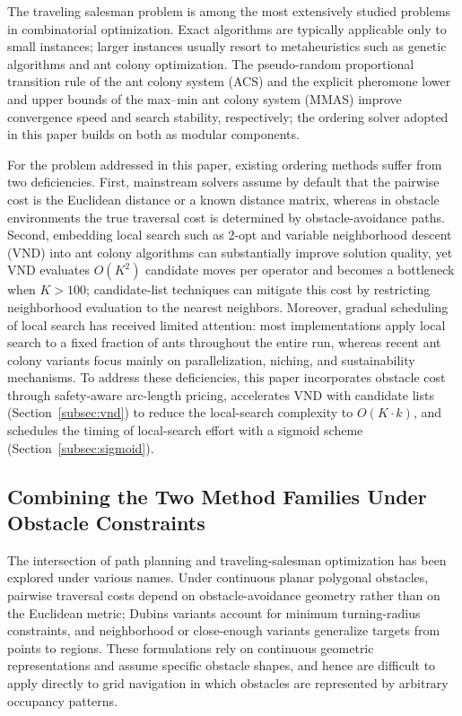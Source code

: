 \documentclass[lettersize,journal]{IEEEtran}
\begin{document}
The traveling salesman problem is among the most extensively studied problems in combinatorial optimization\textcolor{blue}{\cite{ref4,ref36}}. Exact algorithms are typically applicable only to small instances; larger instances usually resort to metaheuristics such as genetic algorithms\textcolor{blue}{\cite{ref19}} and ant colony optimization\textcolor{blue}{\cite{ref21,ref42}}. The pseudo-random proportional transition rule of the ant colony system (ACS)\textcolor{blue}{\cite{ref22}} and the explicit pheromone lower and upper bounds of the max--min ant colony system (MMAS)\textcolor{blue}{\cite{ref23}} improve convergence speed and search stability, respectively; the ordering solver adopted in this paper builds on both as modular components.

For the problem addressed in this paper, existing ordering methods suffer from two deficiencies. First, mainstream solvers assume by default that the pairwise cost is the Euclidean distance or a known distance matrix, whereas in obstacle environments the true traversal cost is determined by obstacle-avoidance paths. Second, embedding local search such as 2-opt and variable neighborhood descent (VND) into ant colony algorithms can substantially improve solution quality\textcolor{blue}{\cite{ref24,ref25,ref43}}, yet VND evaluates $O(K^2)$ candidate moves per operator and becomes a bottleneck when $K > 100$; candidate-list techniques can mitigate this cost by restricting neighborhood evaluation to the nearest neighbors\textcolor{blue}{\cite{ref26}}. Moreover, gradual scheduling of local search has received limited attention: most implementations apply local search to a fixed fraction of ants throughout the entire run, whereas recent ant colony variants focus mainly on parallelization, niching, and sustainability mechanisms\textcolor{blue}{\cite{ref27,ref28,ref29,ref30}}. To address these deficiencies, this paper incorporates obstacle cost through safety-aware arc-length pricing, accelerates VND with candidate lists (Section~\textcolor{blue}{\ref{subsec:vnd}}) to reduce the local-search complexity to $O(K \cdot k)$, and schedules the timing of local-search effort with a sigmoid scheme (Section~\textcolor{blue}{\ref{subsec:sigmoid}}).

\subsection{Combining the Two Method Families Under Obstacle Constraints}

The intersection of path planning and traveling-salesman optimization has been explored under various names\textcolor{blue}{\cite{ref4,ref36}}. Under continuous planar polygonal obstacles, pairwise traversal costs depend on obstacle-avoidance geometry rather than on the Euclidean metric\textcolor{blue}{\cite{ref39}}; Dubins variants account for minimum turning-radius constraints, and neighborhood or close-enough variants generalize targets from points to regions\textcolor{blue}{\cite{ref40}}. These formulations rely on continuous geometric representations and assume specific obstacle shapes, and hence are difficult to apply directly to grid navigation in which obstacles are represented by arbitrary occupancy patterns.
\end{document}
